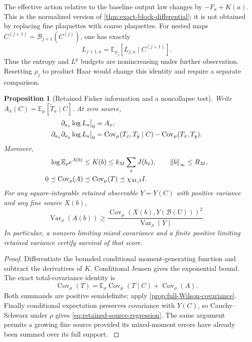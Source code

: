 \documentclass[11pt,oneside,openany]{book}
\newtheorem{proposition}[proposition]{Proposition}
\theoremstyle{definition}
\theoremstyle{remark}
\newcommand{\E}{\mathbb E}
\newcommand{\Var}{\operatorname{Var}}
\newcommand{\Cov}{\operatorname{Cov}}
\newcommand{\norm}[1]{\left\lVert#1\right\rVert}
\newcommand{\src}[2]{\cite[#2]{#1}}
\begin{document}
The effective action relative to the baseline output law changes by
$-F_a+K(a)$. This is the normalized version of
\cref{thm:exact-block-differential}; it is not obtained by replacing
fine plaquettes with coarse plaquettes. For nested maps
$C^{(j+1)}=\mathcal B_{j+1}(C^{(j)})$, one has exactly
\[
 L_{j+1,a}=\E_{\rho_j}[L_{j,a}\mid C^{(j+1)}].
\]
Thus the entropy and $L^p$ budgets are nonincreasing under further
observation. Resetting $\rho_j$ to product Haar would change this
identity and require a separate comparison.

\begin{proposition}[Retained Fisher information and a noncollapse test]
\label{prop:retained-source-information}
Write $A_x(C)=\E_\mu[\widetilde T_x\mid C]$. At zero source,
\begin{align}
 \partial_{a_x}\log L_a\big|_0&=A_x,\notag\\
 \partial_{a_x}\partial_{a_y}\log L_a\big|_0
   &=\Cov_\mu(T_x,T_y\mid C)-\Cov_\mu(T_x,T_y).
 \label{eq:retained-source-derivatives}
\end{align}
Moreover,
\begin{align}
 \log\E_\rho e^{A(b)}&\le K(b)
                \le k_M\sum_xJ(b_x),\qquad \norm b_\infty\le R_M,
                  \notag\\
 0\preceq\Cov_\rho(A)&\preceq\Cov_\mu(T)
                         \preceq\chi_{M,\beta}I.
 \label{eq:retained-source-information}
\end{align}
For any square-integrable retained observable $Y=Y(C)$ with positive
variance and any fine source $X(b)$,
\begin{equation}
 \Var_\rho(A(b))\ge
       \frac{\Cov_\mu(X(b),Y(\mathcal B(U)))^2}{\Var_\rho(Y)}.
 \label{eq:retained-source-regression}
\end{equation}
In particular, a nonzero limiting mixed covariance and a finite
positive limiting retained variance certify survival of that score.
\end{proposition}
\begin{proof}
Differentiate the bounded conditional moment-generating function and
subtract the derivatives of $K$. Conditional Jensen gives the
exponential bound. The exact total-covariance identity is
\[
 \Cov_\mu(T)=\E_\rho\Cov_\mu(T\mid C)+\Cov_\rho(A).
\]
Both summands are positive semidefinite; apply
\cref{prop:full-Wilson-covariance}. Finally conditional expectation
preserves covariance with $Y(C)$, so Cauchy--Schwarz under $\rho$
gives \cref{eq:retained-source-regression}. The same argument permits a
growing fine source provided its mixed-moment errors have already
been summed over its full support. \src{F15}{V2, V4, V7}
\end{proof}
\end{document}
